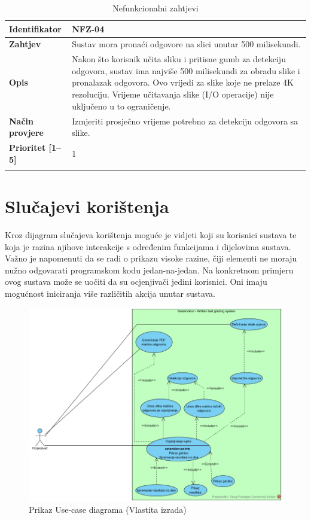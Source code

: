 \documentclass{foi}
\begin{document}
\begin{longtable}{|l|p{12cm}|}
    \textbf{Identifikator} & NFZ-04 \\ \hline
    \textbf{Zahtjev} & Sustav mora pronaći odgovore na slici unutar 500 milisekundi. \\ \hline
    \textbf{Opis} & Nakon što korisnik učita sliku i pritisne gumb za detekciju odgovora, sustav ima najviše 500 milisekundi za obradu slike i pronalazak odgovora. Ovo vrijedi za slike koje ne prelaze 4K rezoluciju. Vrijeme učitavanja slike (I/O operacije) nije uključeno u to ograničenje. \\ \hline
    \textbf{Način provjere} & Izmjeriti prosječno vrijeme potrebno za detekciju odgovora sa slike. \\ \hline
    \textbf{Prioritet [1--5]} & 1 \\ \hline
    
    \caption{Nefunkcionalni zahtjevi}
\end{longtable}

\section{Slučajevi korištenja}

Kroz dijagram slučajeva korištenja moguće je vidjeti koji su korisnici sustava te koja je razina njihove interakcije s određenim funkcijama i dijelovima sustava.
Važno je napomenuti da se radi o prikazu visoke razine, čiji elementi ne moraju nužno odgovarati programskom kodu jedan-na-jedan.
Na konkretnom primjeru ovog sustava može se uočiti da su ocjenjivači jedini korisnici. Oni imaju mogućnost iniciranja više različitih akcija unutar sustava.

\begin{figure}[H]
    \centering
    \includegraphics[width=1.0\linewidth]{slike/useCase.jpg}
    \caption{Prikaz Use-case diagrama (Vlastita izrada)}
\end{figure}
\end{document}
